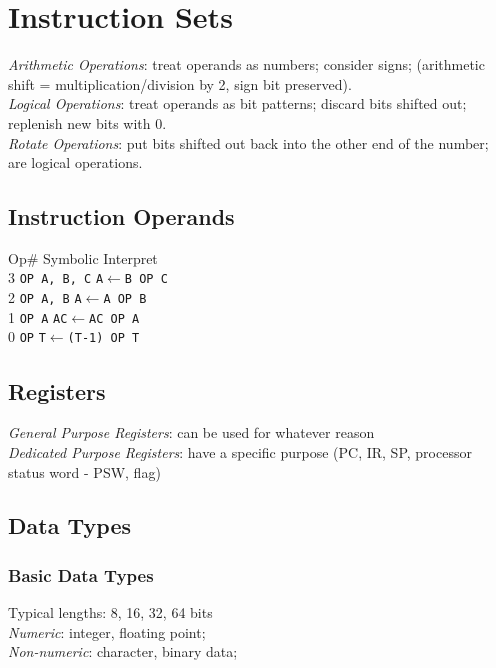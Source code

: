\section{Instruction Sets}

\emph{Arithmetic Operations}: treat operands as numbers; consider signs;
(\eg arithmetic shift = multiplication/division by 2, sign bit preserved).\\
\emph{Logical Operations}: treat operands as bit patterns; discard bits shifted out;
replenish new bits with 0.\\
\emph{Rotate Operations}: put bits shifted out back into the other end of the number;
are logical operations.\\

\subsection*{Instruction Operands}
Op\# \hfill Symbolic \hfill Interpret\\
3 \hspace*{0.2\linewidth} \texttt{OP A, B, C} \hfill \texttt{A$\gets$B OP C}\\
2 \hspace*{0.2\linewidth} \texttt{OP A, B} \hfill \texttt{A$\gets$A OP B}\\
1 \hspace*{0.2\linewidth} \texttt{OP A} \hfill \texttt{AC$\gets$AC OP A}\\
0 \hspace*{0.2\linewidth} \texttt{OP} \hfill \texttt{T$\gets$(T-1) OP T}\\

\subsection*{Registers}
\emph{General Purpose Registers}: can be used for whatever reason\\
\emph{Dedicated Purpose Registers}: have a specific purpose (\eg PC, IR, SP, processor status word - PSW, flag)

\subsection*{Data Types}

\subsubsection*{Basic Data Types}
Typical lengths: 8, 16, 32, 64 bits\\
\emph{Numeric}: integer, floating point;\\
\emph{Non-numeric}: character, binary data;

